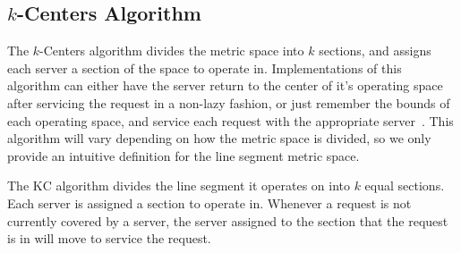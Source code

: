 \subsection{$k$-Centers Algorithm}
\label{sec:KC}
The $k$-Centers algorithm divides the metric space into $k$ sections, and assigns each server a section of the space to operate in. Implementations of this algorithm can either have the server return to the center of it's operating space after servicing the request in a non-lazy fashion, or just remember the bounds of each operating space, and service each request with the appropriate server~\cite{bij2016}. This algorithm will vary depending on how the metric space is divided, so we only provide an intuitive definition for the line segment metric space.

\begin{definition}
    The $\mathrm{KC}$ algorithm divides the line segment it operates on into $k$ equal sections. Each server is assigned a section to operate in. Whenever a request is not currently covered by a server, the server assigned to the section that the request is in will move to service the request.
\end{definition}
